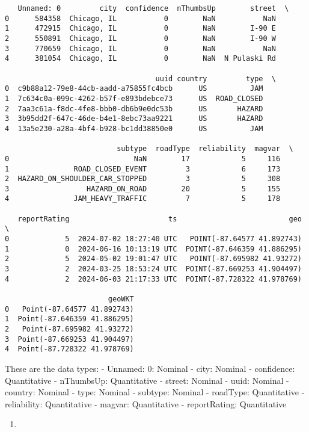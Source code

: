 \documentclass[
  letterpaper,
  DIV=11,
  numbers=noendperiod]{scrartcl}
\providecommand{\tightlist}{%
  \setlength{\itemsep}{0pt}\setlength{\parskip}{0pt}}\usepackage{longtable,booktabs,array}
\begin{document}
\begin{verbatim}
   Unnamed: 0         city  confidence  nThumbsUp        street  \
0      584358  Chicago, IL           0        NaN           NaN   
1      472915  Chicago, IL           0        NaN        I-90 E   
2      550891  Chicago, IL           0        NaN        I-90 W   
3      770659  Chicago, IL           0        NaN           NaN   
4      381054  Chicago, IL           0        NaN  N Pulaski Rd   

                                   uuid country         type  \
0  c9b88a12-79e8-44cb-aadd-a75855fc4bcb      US          JAM   
1  7c634c0a-099c-4262-b57f-e893bdebce73      US  ROAD_CLOSED   
2  7aa3c61a-f8dc-4fe8-bbb0-db6b9e0dc53b      US       HAZARD   
3  3b95dd2f-647c-46de-b4e1-8ebc73aa9221      US       HAZARD   
4  13a5e230-a28a-4bf4-b928-bc1dd38850e0      US          JAM   

                          subtype  roadType  reliability  magvar  \
0                             NaN        17            5     116   
1               ROAD_CLOSED_EVENT         3            6     173   
2  HAZARD_ON_SHOULDER_CAR_STOPPED         3            5     308   
3                  HAZARD_ON_ROAD        20            5     155   
4               JAM_HEAVY_TRAFFIC         7            5     178   

   reportRating                       ts                          geo  \
0             5  2024-07-02 18:27:40 UTC   POINT(-87.64577 41.892743)   
1             0  2024-06-16 10:13:19 UTC  POINT(-87.646359 41.886295)   
2             5  2024-05-02 19:01:47 UTC   POINT(-87.695982 41.93272)   
3             2  2024-03-25 18:53:24 UTC  POINT(-87.669253 41.904497)   
4             2  2024-06-03 21:17:33 UTC  POINT(-87.728322 41.978769)   

                        geoWKT  
0   Point(-87.64577 41.892743)  
1  Point(-87.646359 41.886295)  
2   Point(-87.695982 41.93272)  
3  Point(-87.669253 41.904497)  
4  Point(-87.728322 41.978769)  
\end{verbatim}

These are the data types: - Unnamed: 0: Nominal - city: Nominal -
confidence: Quantitative - nThumbsUp: Quantitative - street: Nominal -
uuid: Nominal - country: Nominal - type: Nominal - subtype: Nominal -
roadType: Quantitative - reliability: Quantitative - magvar:
Quantitative - reportRating: Quantitative

\begin{enumerate}
\def\labelenumi{\arabic{enumi}.}
\setcounter{enumi}{1}
\tightlist
\item
\end{enumerate}
\end{document}

